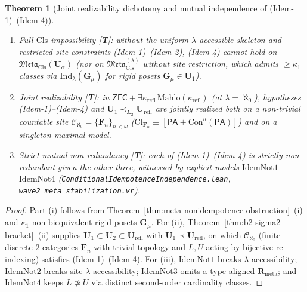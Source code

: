 \documentclass[11pt]{article}
\theoremstyle{plain}
\newtheorem{theorem}{Theorem}[section]
\theoremstyle{definition}
\newcommand{\Meta}{\mathfrak{Meta}}
\newcommand{\Cl}{\mathrm{Cl}}
\newcommand{\Con}{\mathrm{Con}}
\newcommand{\PA}{\mathsf{PA}}
\newcommand{\ZFC}{\mathsf{ZFC}}
\begin{document}
\begin{theorem}[Joint realizability dichotomy and mutual independence of \textup{(Idem-1)--(Idem-4)}]\label{thm:b2-idem-realizability}
\begin{enumerate}[nosep,label=(\roman*)]
\item \emph{Full-$\mathrm{Cls}$ impossibility \textup{[\textbf{T}]}}: without the uniform $\lambda$-accessible skeleton and restricted site constraints \textup{(Idem-1)--(Idem-2)}, \textup{(Idem-4)} cannot hold on $\Meta_{\mathrm{Cls}}(\mathbf{U}_\alpha)$ (nor on $\Meta_{\mathrm{Cls}}^{(\lambda)}$ without site restriction, which admits $\ge \kappa_1$ classes via $\mathrm{Ind}_\lambda(\mathbf{G}_\mu)$ for rigid posets $\mathbf{G}_\mu \in \mathbf{U}_1$).
\item \emph{Joint realizability \textup{[\textbf{T}]}}: in $\ZFC + \exists \kappa_{\mathrm{refl}}\,\mathrm{Mahlo}(\kappa_{\mathrm{refl}})$ (at $\lambda = \aleph_0$), hypotheses \textup{(Idem-1)--(Idem-4)} and $\mathbf{U}_1 \prec_{\Sigma_2} \mathbf{U}_{\mathrm{refl}}$ are jointly realized both on a non-trivial countable site $\mathcal{C}_{\aleph_0} = \{\mathbf{F}_n\}_{n < \omega}$ ($\Cl_{\mathbf{F}_n} \equiv [\PA + \Con^n(\PA)]$) and on a singleton maximal model.
\item \emph{Strict mutual non-redundancy \textup{[\textbf{T}]}}: each of \textup{(Idem-1)--(Idem-4)} is strictly non-redundant given the other three, witnessed by explicit models $\mathrm{IdemNot1}$--$\mathrm{IdemNot4}$ (\texttt{ConditionalIdempotenceIndependence.lean}, \texttt{wave2\_meta\_stabilization.vr}).
\end{enumerate}
\end{theorem}
\begin{proof}
Part (i) follows from Theorem~\ref{thm:meta-nonidempotence-obstruction}~(i) and $\kappa_1$ non-biequivalent rigid posets $\mathbf{G}_\mu$. For (ii), Theorem~\ref{thm:b2-sigma2-bracket}~(ii) supplies $\mathbf{U}_1 \subset \mathbf{U}_2 \subset \mathbf{U}_{\mathrm{refl}}$ with $\mathbf{U}_1 \prec \mathbf{U}_{\mathrm{refl}}$, on which $\mathcal{C}_{\aleph_0}$ (finite discrete $2$-categories $\mathbf{F}_n$ with trivial topology and $L, U$ acting by bijective re-indexing) satisfies (Idem-1)--(Idem-4). For (iii), $\mathrm{IdemNot1}$ breaks $\lambda$-accessibility; $\mathrm{IdemNot2}$ breaks site $\lambda$-accessibility; $\mathrm{IdemNot3}$ omits a type-aligned $\mathbf{R}_{\mathrm{meta}}$; and $\mathrm{IdemNot4}$ keeps $L \not\simeq U$ via distinct second-order cardinality classes.
\end{proof}
\end{document}
